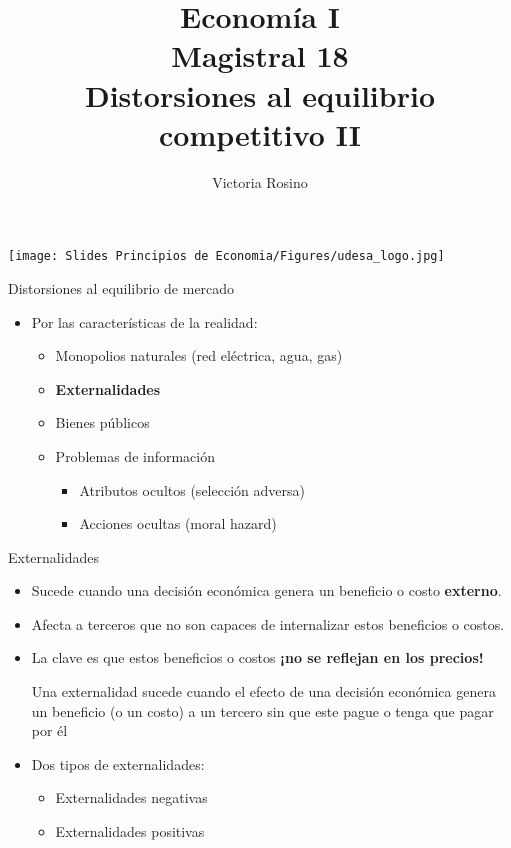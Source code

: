 \documentclass{beamer}
\title[Economía I]{Economía I \vspace{3mm}
\\ Magistral 18 \vspace{3mm} \\ Distorsiones al equilibrio competitivo II}
\date{}
\author[Victoria Rosino]{Victoria Rosino}
\institute[]{Universidad de San Andrés}
\begin{document}
\begin{frame}
\vspace{0.3cm}
\titlepage
\centering
\vspace{-0.9cm}
\texttt{[image: Slides Principios de Economia/Figures/udesa\_logo.jpg]} 
\end{frame}


\begin{frame}{Distorsiones al equilibrio de mercado}
    \begin{itemize}
        \item Por las características de la realidad: \vspace{1mm}
        \begin{itemize}
            \item Monopolios naturales (red eléctrica, agua, gas)   
             \vspace{1mm}
            \item \textbf{Externalidades}
             \vspace{1mm}
            \item Bienes públicos
            \vspace{1mm}
            \item Problemas de información
            \begin{itemize}
                \item Atributos ocultos (selección adversa)
                 \vspace{1mm}
                \item Acciones ocultas (moral hazard)
            \end{itemize}        
        \end{itemize}
    \end{itemize}
\end{frame}

\begin{frame}{Externalidades}
    \begin{itemize}
        \item Sucede cuando una decisión económica genera un beneficio o costo \textbf{externo}.
        \item Afecta a terceros que no son capaces de internalizar estos beneficios o costos.
        \item La clave es que estos beneficios o costos \textbf{¡no se reflejan en los precios!}
        \begin{boxB}
            \centering
            Una externalidad sucede cuando el efecto de una decisión económica genera un beneficio (o un costo) a un tercero sin que este pague o tenga que pagar por él
        \end{boxB}
        \item Dos tipos de externalidades: 
        \begin{itemize}
            \item Externalidades negativas
            \vspace{1mm}
            \item Externalidades positivas
        \end{itemize}   
    \end{itemize}
\end{frame}
\end{document}
